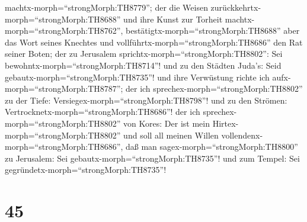 machtx-morph=``strongMorph:TH8779''; der die Weisen
zurückkehrtx-morph=``strongMorph:TH8688'' und ihre Kunst zur Torheit
machtx-morph=``strongMorph:TH8762'', 
bestätigtx-morph=``strongMorph:TH8688'' aber das Wort seines Knechtes
und vollführtx-morph=``strongMorph:TH8686'' den Rat seiner Boten; der zu
Jerusalem sprichtx-morph=``strongMorph:TH8802'': Sei
bewohntx-morph=``strongMorph:TH8714''! und zu den Städten Juda's: Seid
gebautx-morph=``strongMorph:TH8735''! und ihre Verwüstung richte ich
aufx-morph=``strongMorph:TH8787'';  der ich
sprechex-morph=``strongMorph:TH8802'' zu der Tiefe:
Versiegex-morph=``strongMorph:TH8798''! und zu den Strömen:
Vertrocknetx-morph=``strongMorph:TH8686''!  der ich
sprechex-morph=``strongMorph:TH8802'' von Kores: Der ist mein
Hirtex-morph=``strongMorph:TH8802'' und soll all meinen Willen
vollendenx-morph=``strongMorph:TH8686'', daß man
sagex-morph=``strongMorph:TH8800'' zu Jerusalem: Sei
gebautx-morph=``strongMorph:TH8735''! und zum Tempel: Sei
gegründetx-morph=``strongMorph:TH8735''!

\hypertarget{section-44}{%
\section{45}\label{section-44}}

